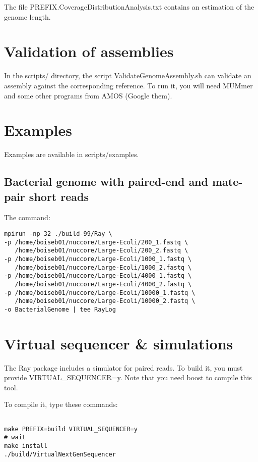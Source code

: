 \documentclass{article}
\begin{document}
The file PREFIX.CoverageDistributionAnalysis.txt contains an estimation of the genome length.


\newpage

\section{Validation of assemblies}

In the scripts/ directory, the script ValidateGenomeAssembly.sh can validate an assembly against the corresponding
reference. To run it, you will need MUMmer and some other programs from AMOS (Google them).


\section{Examples}

Examples are available in scripts/examples.

\subsection{Bacterial genome with paired-end and mate-pair short reads}

The command:

\begin{verbatim}
mpirun -np 32 ./build-99/Ray \
-p /home/boiseb01/nuccore/Large-Ecoli/200_1.fastq \
   /home/boiseb01/nuccore/Large-Ecoli/200_2.fastq \
-p /home/boiseb01/nuccore/Large-Ecoli/1000_1.fastq \
   /home/boiseb01/nuccore/Large-Ecoli/1000_2.fastq \
-p /home/boiseb01/nuccore/Large-Ecoli/4000_1.fastq \
   /home/boiseb01/nuccore/Large-Ecoli/4000_2.fastq \
-p /home/boiseb01/nuccore/Large-Ecoli/10000_1.fastq \
   /home/boiseb01/nuccore/Large-Ecoli/10000_2.fastq \
-o BacterialGenome | tee RayLog
\end{verbatim}

\section{Virtual sequencer \& simulations}

The Ray package includes a simulator for paired reads.
To build it, you must provide VIRTUAL\_SEQUENCER=y.
Note that you need boost to compile this tool.

To compile it, type these commands:

\begin{verbatim}

make PREFIX=build VIRTUAL_SEQUENCER=y
# wait
make install
./build/VirtualNextGenSequencer 
\end{verbatim}
\end{document}
